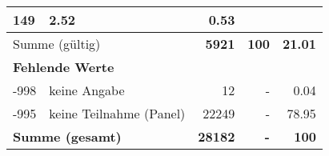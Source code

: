 \begin{longtable}{lXrrr}
       \num{149} &
       \num[round-mode=places,round-precision=2]{2,52} &
         \num[round-mode=places,round-precision=2]{0,53} \\
     \midrule
     \multicolumn{2}{l}{Summe (gültig)} &
       \textbf{\num{5921}} &
     \textbf{100} &
       \textbf{\num[round-mode=places,round-precision=2]{21,01}} \\
     \multicolumn{5}{l}{\textbf{Fehlende Werte}}\\
       -998 &
       keine Angabe &
         \num{12} &
        - &
         \num[round-mode=places,round-precision=2]{0,04} \\
       -995 &
       keine Teilnahme (Panel) &
         \num{22249} &
        - &
         \num[round-mode=places,round-precision=2]{78,95} \\
     \midrule
     \multicolumn{2}{l}{\textbf{Summe (gesamt)}} &
          \textbf{\num{28182}} &
        \textbf{-} &
        \textbf{100} \\
     \bottomrule
     \end{longtable}
     
